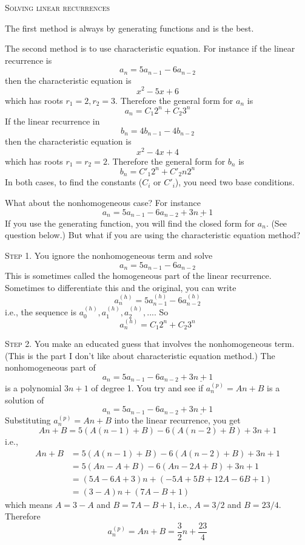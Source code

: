 \textsc{Solving linear recurrences}

The first method is always by generating functions and is the best.

The second method is to use characteristic equation.
For instance if the linear recurrence is
\[
a_n = 5a_{n-1} - 6a_{n-2}
\]
then the characteristic equation is
\[
x^2 - 5x + 6
\]
which has roots $r_1 = 2, r_2 = 3$.
Therefore the general form for $a_n$ is
\[
a_n = C_1 2^n + C_2 3^n
\]
If the linear recurrence in
\[
b_n = 4b_{n-1} - 4b_{n-2}
\]
then the characteristic equation is
\[
x^2 - 4x + 4
\]
which has roots $r_1 = r_2 = 2$.
Therefore the general form for $b_n$ is
\[
b_n = C'_1 2^n + C'_2 n2^n
\]
In both cases, to find the constants ($C_i$ or $C'_i$), you need
two base conditions.

What about the nonhomogeneous case?
For instance
\[
a_n = 5a_{n-1} - 6a_{n-2} + \underline{3n + 1}
\]
If you use the generating function, you will find the closed form
for $a_n$. (See question below.)
But what if you are using the characteristic equation method?

\textsc{Step 1.} You ignore the nonhomogeneous term and solve
\[
a_n = 5a_{n-1} - 6a_{n-2}
\]
This is sometimes called the homogeneous part of the linear recurrence.
Sometimes to differentiate this and the original,
you can write
\[
a_n^{(h)} = 5a_{n-1}^{(h)} - 6a_{n-2}^{(h)}
\]
i.e., the sequence is $a_0^{(h)}, a_1^{(h)}, a_2^{(h)}, ...$.
So
\[
a_n^{(h)} = C_1 2^n + C_2 3^n
\]

\textsc{Step 2.}
You make an educated guess that involves the
nonhomogeneous term.
(This is the part I don't like about characteristic equation method.)
The nonhomogeneous part of
\[
a_n = 5a_{n-1} - 6a_{n-2} + \underline{3n + 1}
\]
is a polynomial $3n+1$ of degree 1.
You try and see if $a_n^{(p)} = An + B$ is a solution of 
\[
a_n = 5a_{n-1} - 6a_{n-2} + \underline{3n + 1}
\]
Substituting $a_n^{(p)} = An + B$ into the linear recurrence, you get
\[
An + B = 5(A(n-1) + B) - 6(A(n-2) + B) + 3n + 1
\]
i.e.,
\begin{align*}
An + B
&= 5(A(n-1) + B) - 6(A(n-2) + B) + 3n + 1 \\
&= 5(An - A + B) - 6(An - 2A + B) + 3n + 1 \\
&= (5A - 6A + 3)n + (-5A + 5B + 12A - 6B + 1) \\
&= (3 - A)n + (7A - B + 1)
\end{align*}
which means $A = 3 - A$ and $B = 7A - B + 1$, i.e.,
$A = 3/2$ and $B = 23/4$.
Therefore
\[
a_n^{(p)} = An + B = \frac{3}{2}n + \frac{23}{4}
\]

